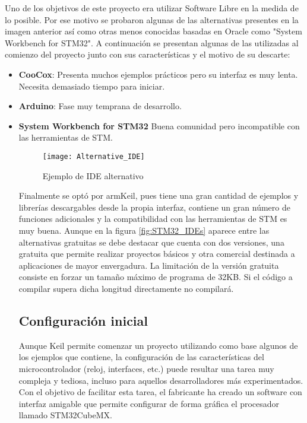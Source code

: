 Uno de los objetivos de este proyecto era utilizar Software Libre en la medida de lo posible. Por ese motivo se probaron algunas de las alternativas presentes en la imagen anterior así como otras menos conocidas basadas en Oracle como "System Workbench for STM32". A continuación se presentan algunas de las utilizadas al comienzo del proyecto junto con sus características y el motivo de su descarte:
\begin{itemize}
   \item \textbf{CooCox}: Presenta muchos ejemplos prácticos pero su interfaz es muy lenta. Necesita demasiado tiempo para iniciar.
   \item \textbf{Arduino}: Fase muy temprana de desarrollo.
   \item \textbf{System Workbench for STM32} Buena comunidad pero incompatible con las herramientas de STM.

\begin{figure} [h]
    \centering
    \texttt{[image: Alternative\_IDE]}
    \caption{Ejemplo de \acrshort{IDE} alternativo}
    \label{fig:Alternative_IDE}
\end{figure}

Finalmente se optó por armKeil, pues tiene una gran cantidad de ejemplos y librerías descargables desde la propia interfaz, contiene un gran número de funciones adicionales y la compatibilidad con las herramientas de STM es muy buena. Aunque en la figura \ref{fig:STM32_IDEs} aparece entre las alternativas gratuitas se debe destacar que cuenta con dos versiones, una gratuita que permite realizar proyectos básicos y otra comercial destinada a aplicaciones de mayor envergadura. La limitación de la versión gratuita consiste en forzar un tamaño máximo de programa de 32KB. Si el código a compilar supera dicha longitud directamente no compilará.

\subsection{Configuración inicial\label{Configuracion_micro}}

Aunque Keil permite comenzar un proyecto utilizando como base algunos de los ejemplos que contiene, la configuración de las características del microcontrolador (reloj, interfaces, etc.) puede resultar una tarea muy compleja y tediosa, incluso para aquellos desarrolladores más experimentados. Con el objetivo de facilitar esta tarea, el fabricante ha creado un software con interfaz amigable que permite configurar de forma gráfica el procesador llamado STM32CubeMX.


\end{itemize}
